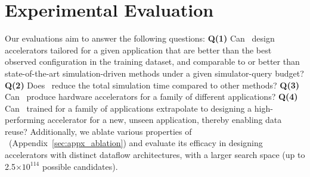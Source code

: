 \section{Experimental Evaluation}
\label{sec:eval}
%
Our evaluations aim to answer the following questions: \textbf{Q(1)} {Can \primemethodname\ design accelerators tailored for a given application that are better than the best observed configuration in the training dataset, and comparable to or better than state-of-the-art simulation-driven methods under a given simulator-query budget?} \textbf{Q(2)} {Does \primemethodname\ reduce the total simulation time compared to other methods?} \textbf{Q(3)} {Can \primemethodname\ produce hardware accelerators for a family of different applications?} \textbf{Q(4)} {Can \primemethodname\ trained for a family of applications extrapolate to designing a high-performing accelerator for a new, unseen application, thereby enabling data reuse?} Additionally, we ablate various properties of \primemethodname\ (Appendix~\ref{sec:appx_ablation}) and evaluate its efficacy in designing accelerators with distinct dataflow architectures, with a larger search space (up to 2.5$\times10^{114}$ possible candidates).

